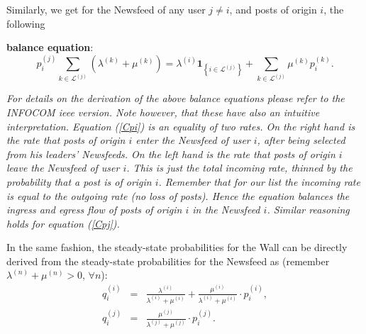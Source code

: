 \documentclass[10pt, conference, letterpaper]{IEEEtran}
\begin{document}
Similarly, we get for the Newsfeed of any user $j\neq i$, and posts of origin $i$, the following {\textbf{balance equation}: 
\begin{equation}
\label{Cpj}
p_i^{(j)}\sum_{k \in \mathcal{L}^{(j)}}\left(\lambda^{(k)}+\mu^{(k)}\right) = \lambda^{(i)}\mathbf{1}_{\left\{i\in \mathcal{L}^{(j)}\right\}} + \sum_{k \in \mathcal{L}^{(j)}}\mu^{(k)}p_i^{(k)}.
\end{equation}

\textit{For details on the derivation of the above balance equations please refer to the INFOCOM ieee version. Note however, that these have also an intuitive interpretation. Equation (\ref{Cpi}) is an equality of two rates. On the right hand is the rate that posts of origin $i$ enter the Newsfeed of user $i$, after being selected from his leaders' Newsfeeds. On the left hand is the rate that posts of origin $i$ leave the Newsfeed of user $i$. This is just the total incoming rate, thinned by the probability that a post is of origin $i$. Remember that for our list the incoming rate is equal to the outgoing rate (no loss of posts). Hence the equation balances the ingress and egress flow of posts of origin $i$ in the Newsfeed $i$. Similar reasoning holds for equation (\ref{Cpj}). }

%

In the same fashion, the steady-state probabilities for the Wall can be directly derived from the steady-state probabilities for the Newsfeed as (remember $\lambda^{(n)}+\mu^{(n)}>0$, $\forall n$):
\begin{eqnarray}
\label{Cqi}
q_i^{(i)} & = & \frac{\lambda^{(i)}}{\lambda^{(i)}+\mu^{(i)}} + \frac{\mu^{(i)}}{\lambda^{(i)}+\mu^{(i)}}\cdot p_i^{(i)},\\
\label{Cqj}
q_i^{(j)} & = & \frac{\mu^{(j)}}{\lambda^{(j)}+\mu^{(j)}}\cdot p_i^{(j)}.
\end{eqnarray}


}
\end{document}
